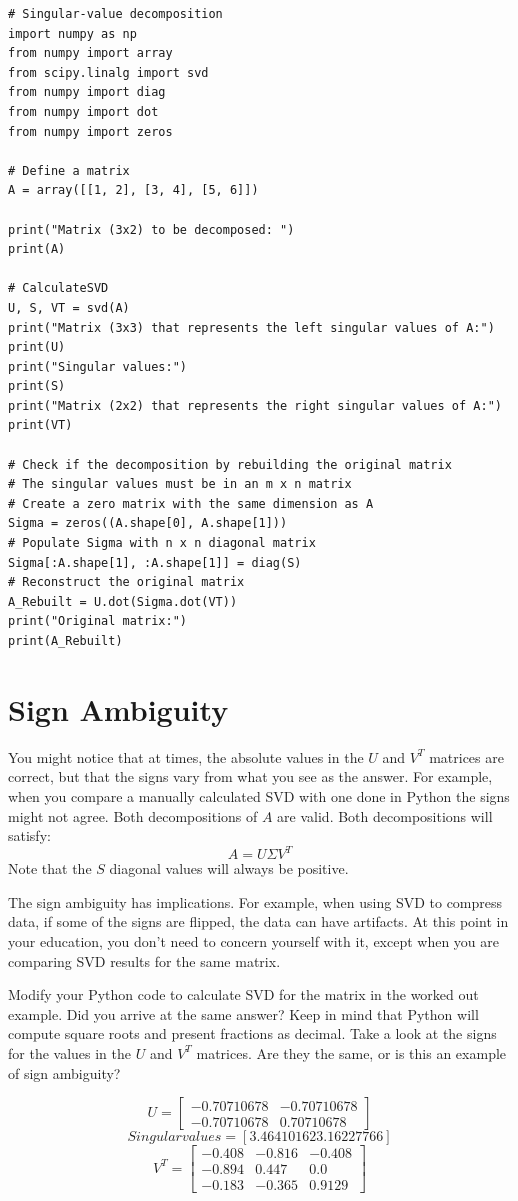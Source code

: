 \begin{Verbatim}
# Singular-value decomposition
import numpy as np
from numpy import array
from scipy.linalg import svd
from numpy import diag
from numpy import dot
from numpy import zeros

# Define a matrix
A = array([[1, 2], [3, 4], [5, 6]])

print("Matrix (3x2) to be decomposed: ")
print(A)

# CalculateSVD
U, S, VT = svd(A)
print("Matrix (3x3) that represents the left singular values of A:")
print(U)
print("Singular values:")
print(S)
print("Matrix (2x2) that represents the right singular values of A:")
print(VT)

# Check if the decomposition by rebuilding the original matrix
# The singular values must be in an m x n matrix 
# Create a zero matrix with the same dimension as A
Sigma = zeros((A.shape[0], A.shape[1]))
# Populate Sigma with n x n diagonal matrix
Sigma[:A.shape[1], :A.shape[1]] = diag(S)
# Reconstruct the original matrix
A_Rebuilt = U.dot(Sigma.dot(VT))
print("Original matrix:")
print(A_Rebuilt)
\end{Verbatim}

\section{Sign Ambiguity}
You might notice that at times, the absolute values in the $U$ and $V^T$ matrices are correct, but that the signs vary from what you see as the answer. For example, when you compare a manually calculated SVD with one done in Python the signs might not agree. Both decompositions of $A$ are valid. Both decompositions will satisfy:
$$A = U \Sigma V^T$$
Note that the $S$ diagonal values will always be positive. 

The sign ambiguity has implications. For example, when using SVD to compress data, if some of the signs are flipped, the data can have artifacts. At this point in your education, you don't need to concern yourself with it, except when you are comparing SVD results for the same matrix.

\begin{Exercise}[title={Single Value Decomposition}, label=svd]
Modify your Python code to calculate SVD for the matrix in the worked out example. Did you arrive at the same answer? Keep in mind that Python will compute square roots and present fractions as decimal. Take a look at the signs for the values in the $U$ and $V^T$ matrices. Are they the same, or is this an example of sign ambiguity? 
\end{Exercise}
\begin{Answer}[ref=svd]
$$U = 
\begin{bmatrix}
-0.70710678 & -0.70710678  \\
 -0.70710678 & 0.70710678 
\end{bmatrix}
$$
$$Singular values = [3.46410162 3.16227766]
$$
$$V^T =
\begin{bmatrix}
 -0.408 & -0.816 & -0.408  \\
 -0.894 & 0.447 & 0.0  \\
 -0.183 & -0.365  & 0.9129 
\end{bmatrix}
$$
\end{Answer}

